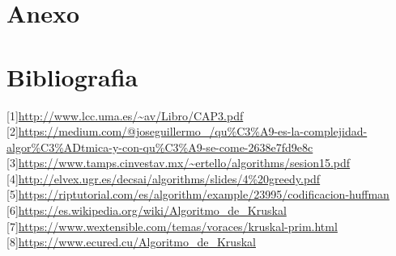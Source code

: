 \documentclass[spanish]{article}
\begin{document}
	\section{Anexo}			
	\section{Bibliografia}
		{[}1{]}\url{http://www.lcc.uma.es/~av/Libro/CAP3.pdf}\\
		{[}2{]}\url{https://medium.com/@joseguillermo_/qu\%C3\%A9-es-la-complejidad-algor\%C3\%ADtmica-y-con-qu\%C3\%A9-se-come-2638e7fd9e8c}\\
		{[}3{]}\url{https://www.tamps.cinvestav.mx/~ertello/algorithms/sesion15.pdf	}\\		
		{[}4{]}\url{http://elvex.ugr.es/decsai/algorithms/slides/4\%20greedy.pdf}\\		
		{[}5{]}\url{https://riptutorial.com/es/algorithm/example/23995/codificacion-huffman}\\	
		{[}6{]}\url{https://es.wikipedia.org/wiki/Algoritmo_de_Kruskal}\\	
		{[}7{]}\url{https://www.wextensible.com/temas/voraces/kruskal-prim.html}\\	
		{[}8{]}\url{https://www.ecured.cu/Algoritmo_de_Kruskal}\\		
	
\end{document}
